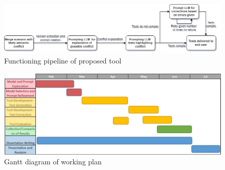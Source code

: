 \begin{figure}
    \centering
    \includegraphics[width=1\linewidth]{figures/tool.png}
    \caption{Functioning pipeline of proposed tool}
    \label{fig:tool}
\end{figure}

\begin{figure}
    \centering
    \includegraphics[width=1\linewidth]{figures/gantt.jpg}
    \caption{Gantt diagram of working plan}
    \label{fig:gantt}
\end{figure}
